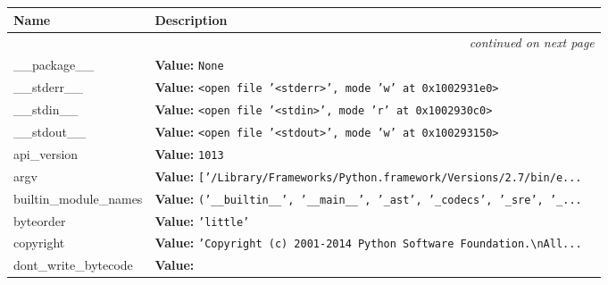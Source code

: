     \vspace{-1cm}
\hspace{\varindent}\begin{longtable}{|p{\varnamewidth}|p{\vardescrwidth}|l}
\cline{1-2}
\cline{1-2} \centering \textbf{Name} & \centering \textbf{Description}& \\
\cline{1-2}
\endhead\cline{1-2}\multicolumn{3}{r}{\small\textit{continued on next page}}\\\endfoot\cline{1-2}
\endlastfoot\raggedright \_\-\_\-p\-a\-c\-k\-a\-g\-e\-\_\-\_\- & \raggedright \textbf{Value:} 
{\tt None}&\\
\cline{1-2}
\raggedright \_\-\_\-s\-t\-d\-e\-r\-r\-\_\-\_\- & \raggedright \textbf{Value:} 
{\tt {\textless}open file '{\textless}stderr{\textgreater}', mode 'w' at 0x1002931e0{\textgreater}}&\\
\cline{1-2}
\raggedright \_\-\_\-s\-t\-d\-i\-n\-\_\-\_\- & \raggedright \textbf{Value:} 
{\tt {\textless}open file '{\textless}stdin{\textgreater}', mode 'r' at 0x1002930c0{\textgreater}}&\\
\cline{1-2}
\raggedright \_\-\_\-s\-t\-d\-o\-u\-t\-\_\-\_\- & \raggedright \textbf{Value:} 
{\tt {\textless}open file '{\textless}stdout{\textgreater}', mode 'w' at 0x100293150{\textgreater}}&\\
\cline{1-2}
\raggedright a\-p\-i\-\_\-v\-e\-r\-s\-i\-o\-n\- & \raggedright \textbf{Value:} 
{\tt 1013}&\\
\cline{1-2}
\raggedright a\-r\-g\-v\- & \raggedright \textbf{Value:} 
{\tt \texttt{[}\texttt{'}\texttt{/Library/Frameworks/Python.framework/Versions/2.7/bin/e}\texttt{...}}&\\
\cline{1-2}
\raggedright b\-u\-i\-l\-t\-i\-n\-\_\-m\-o\-d\-u\-l\-e\-\_\-n\-a\-m\-e\-s\- & \raggedright \textbf{Value:} 
{\tt \texttt{(}\texttt{'}\texttt{\_\_builtin\_\_}\texttt{'}\texttt{, }\texttt{'}\texttt{\_\_main\_\_}\texttt{'}\texttt{, }\texttt{'}\texttt{\_ast}\texttt{'}\texttt{, }\texttt{'}\texttt{\_codecs}\texttt{'}\texttt{, }\texttt{'}\texttt{\_sre}\texttt{'}\texttt{, }\texttt{'}\texttt{\_}\texttt{...}}&\\
\cline{1-2}
\raggedright b\-y\-t\-e\-o\-r\-d\-e\-r\- & \raggedright \textbf{Value:} 
{\tt \texttt{'}\texttt{little}\texttt{'}}&\\
\cline{1-2}
\raggedright c\-o\-p\-y\-r\-i\-g\-h\-t\- & \raggedright \textbf{Value:} 
{\tt \texttt{'}\texttt{Copyright (c) 2001-2014 Python Software Foundation.{\textbackslash}nAll}\texttt{...}}&\\
\cline{1-2}
\raggedright d\-o\-n\-t\-\_\-w\-r\-i\-t\-e\-\_\-b\-y\-t\-e\-c\-o\-d\-e\- & \raggedright \textbf{Value:} 

\end{longtable}

